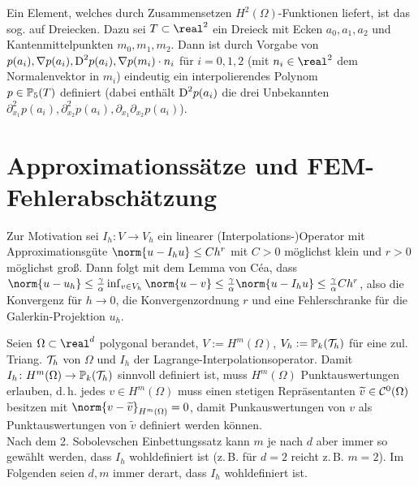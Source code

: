 \linie

\begin{Bem}
    Ein Element, welches durch Zusammensetzen $H^2(\Omega)$-Funktionen liefert, ist das sog.
     auf Dreiecken.
    Dazu sei $T \subset \real^2$ ein Dreieck mit Ecken $a_0, a_1, a_2$ und
    Kantenmittelpunkten $m_0, m_1, m_2$.
    Dann ist durch Vorgabe von $p(a_i), \nabla p(a_i), \text{D}^2 p(a_i), \nabla p(m_i) \cdot n_i$
    für $i = 0, 1, 2$ (mit $n_i \in \real^2$ dem Normalenvektor in $m_i$) eindeutig ein
    interpolierendes Polynom\\
    $p \in \mathbb{P}_5(T)$ definiert
    (dabei enthält $\text{D}^2 p(a_i)$ die drei Unbekannten
    $\partial_{x_1}^2 p(a_i), \partial_{x_2}^2 p(a_i), \partial_{x_1} \partial_{x_2} p(a_i)$).
\end{Bem}

\pagebreak

\section{%
    Approximationssätze und FEM-Fehlerabschätzung%
}

\begin{Bem}
    Zur Motivation sei $I_h\colon V \to V_h$ ein linearer (Interpolations-)Operator mit
    Approximationsgüte $\norm{u - I_h u} \le Ch^r$ mit $C > 0$ möglichst klein und
    $r > 0$ möglichst groß.
    Dann folgt mit dem Lemma von Céa, dass
    $\norm{u - u_h} \le \frac{\gamma}{\alpha} \inf_{v \in V_h} \norm{u - v}
    \le \frac{\gamma}{\alpha} \norm{u - I_h u} \le \frac{\gamma}{\alpha} Ch^r$,
    also die Konvergenz für $h \to 0$, die Konvergenzordnung $r$ und eine
    Fehlerschranke für die Galerkin-Projektion $u_h$.
\end{Bem}

\begin{Bem}
    Seien $\Omega \subset \real^d$ polygonal berandet, $V := H^m(\Omega)$,
    $V_h := \mathbb{P}_k(\mathcal{T}_h)$ für eine zul. Triang. $\mathcal{T}_h$ von $\Omega$
    und $I_h$ der Lagrange-Interpolationsoperator.
    Damit $I_h\colon H^m(\Omega) \to \mathbb{P}_k(\mathcal{T}_h)$ sinnvoll definiert ist,
    muss $H^m(\Omega)$ Punktauswertungen erlauben,
    d.\,h. jedes $v \in H^m(\Omega)$ muss einen stetigen Repräsentanten
    $\widetilde{v} \in \mathcal{C}^0(\Omega)$ besitzen mit $\norm{v - \widetilde{v}}_{H^m(\Omega)} = 0$,
    damit Punkauswertungen von $v$ als Punktauswertungen von $\widetilde{v}$ definiert werden
    können.\\
    Nach dem 2. Sobolevschen Einbettungssatz kann $m$ je nach $d$ aber immer so gewählt werden,
    dass $I_h$ wohldefiniert ist
    (z.\,B. für $d = 2$ reicht z.\,B. $m = 2$).
    Im Folgenden seien $d, m$ immer derart, dass $I_h$ wohldefiniert ist.
\end{Bem}

